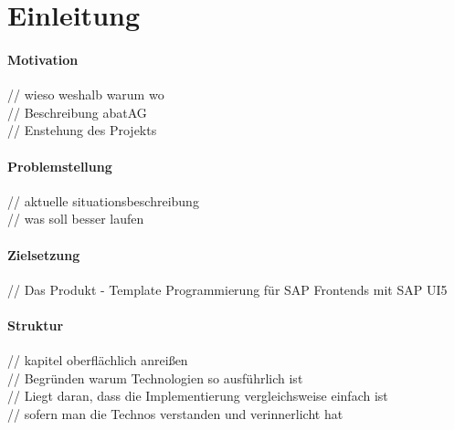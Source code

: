 \section{Einleitung}\label{einleitung}
\paragraph{Motivation}
// wieso weshalb warum wo\\
// Beschreibung abatAG\\
// Enstehung des Projekts\\

\paragraph{Problemstellung}
// aktuelle situationsbeschreibung\\
// was soll besser laufen\\

\paragraph{Zielsetzung}
// Das Produkt - Template Programmierung für SAP Frontends mit SAP UI5

\paragraph{Struktur}
// kapitel oberflächlich anreißen\\
// Begründen warum Technologien so ausführlich ist\\
// Liegt daran, dass die Implementierung vergleichsweise einfach ist\\
// sofern man die Technos verstanden und verinnerlicht hat\\